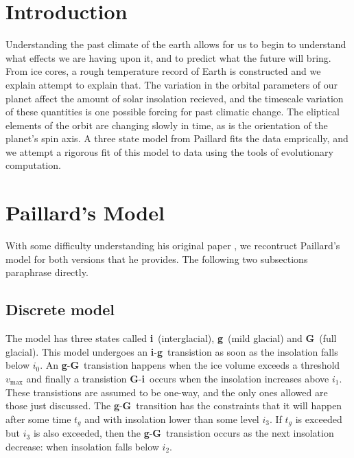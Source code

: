 \section{Introduction}

Understanding the past climate of the earth allows for us to begin to understand what effects we are having upon it, and to predict what the future will bring.
From ice cores, a rough temperature record of Earth is constructed and we explain attempt to explain that.
The variation in the orbital parameters of our planet affect the amount of solar insolation recieved, and the timescale variation of these quantities is one possible forcing for past climatic change.
The eliptical elements of the orbit are changing slowly in time, as is the orientation of the planet's spin axis.
A three state model from Paillard fits the data emprically, and we attempt a rigorous fit of this model to data using the tools of evolutionary computation.

\section{Paillard's Model}

With some difficulty understanding his original paper \cite{paillard1998timing}, we recontruct Paillard's model for both versions that he provides.
The following two subsections paraphrase \cite{paillard1998timing} directly.

\subsection{Discrete model}

\newcommand{\inter}{\textbf{i}}
\newcommand{\mild}{\textbf{g}}
\newcommand{\full}{\textbf{G}}

The model has three states called \inter~(interglacial), \mild~(mild glacial) and \full~(full glacial).
This model undergoes an \inter-\mild~transistion as soon as the insolation falls below $i_0$.
An \mild-\full~transistion happens when the ice volume exceeds a threshold $v_\text{max}$ and finally a transistion \full-\inter~occurs when the insolation increases above $i_1$.
These transistions are assumed to be one-way, and the only ones allowed are those just discussed.
The \mild-\full~transition has the constraints that it will happen after some time $t_g$ and with insolation lower than some level $i_3$.
If $t_g$ is exceeded but $i_3$ is also exceeded, then the \mild-\full~transistion occurs as the next insolation decrease: when insolation falls below $i_2$.

